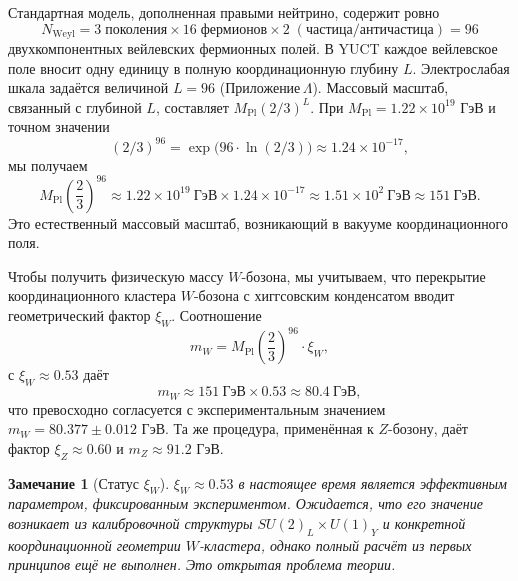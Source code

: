 \documentclass[11pt,a4paper]{article}
\newtheorem{remark}{Замечание}
\begin{document}
	Стандартная модель, дополненная правыми нейтрино, содержит ровно
	\begin{equation}
		N_{\mathrm{Weyl}} = 3\;\text{поколения} \times 16\;\text{фермионов} \times 2\;(\text{частица/античастица}) = 96
	\end{equation}
	двухкомпонентных вейлевских фермионных полей.  В YUCT каждое вейлевское поле вносит одну единицу в полную координационную глубину \(L\).  Электрослабая шкала задаётся величиной \(L = 96\) (Приложение \(\Lambda\)).  Массовый масштаб, связанный с глубиной \(L\), составляет \(M_{\mathrm{Pl}} (2/3)^{L}\).  При \(M_{\mathrm{Pl}} = 1.22 \times 10^{19}\) ГэВ и точном значении
	\begin{equation}
		(2/3)^{96} = \exp\bigl(96 \cdot \ln(2/3)\bigr) \approx 1.24 \times 10^{-17},
	\end{equation}
	мы получаем
	\begin{equation}
		M_{\mathrm{Pl}} \left(\frac{2}{3}\right)^{96} \approx 1.22 \times 10^{19}\ \mathrm{ГэВ} \times 1.24 \times 10^{-17} \approx 1.51 \times 10^{2}\ \mathrm{ГэВ} \approx 151\ \mathrm{ГэВ}.
	\end{equation}
	Это естественный массовый масштаб, возникающий в вакууме координационного поля.
	
	Чтобы получить физическую массу \(W\)-бозона, мы учитываем, что перекрытие координационного кластера \(W\)-бозона с хиггсовским конденсатом вводит геометрический фактор \(\xi_W\).  Соотношение
	\begin{equation}
		m_W = M_{\mathrm{Pl}} \left(\frac{2}{3}\right)^{96} \cdot \xi_W,
		\label{eq:mw}
	\end{equation}
	с \(\xi_W \approx 0.53\) даёт
	\begin{equation}
		m_W \approx 151\ \mathrm{ГэВ} \times 0.53 \approx 80.4\ \mathrm{ГэВ},
	\end{equation}
	что превосходно согласуется с экспериментальным значением \(m_W = 80.377 \pm 0.012\) ГэВ.  Та же процедура, применённая к \(Z\)-бозону, даёт фактор \(\xi_Z \approx 0.60\) и \(m_Z \approx 91.2\) ГэВ.
	
	\begin{remark}[Статус \(\xi_W\)]
		\(\xi_W \approx 0.53\) в настоящее время является эффективным параметром, фиксированным экспериментом.  Ожидается, что его значение возникает из калибровочной структуры \(SU(2)_L \times U(1)_Y\) и конкретной координационной геометрии \(W\)-кластера, однако полный расчёт из первых принципов ещё не выполнен.  Это открытая проблема теории.
	\end{remark}
	
\end{document}
